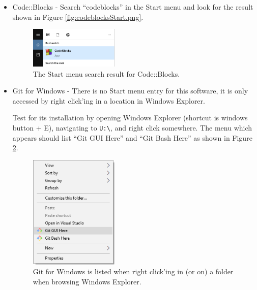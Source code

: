 \documentclass{lab}
\begin{document}
\begin{itemize}
\item Code::Blocks - Search ``codeblocks'' in the Start menu and look for the result shown in Figure \ref{fig:codeblocksStart.png}.

\begin{figure}[H]
\begin{center}
\includegraphics[width=0.4\textwidth]{Wk1Images/cbstart.png}
\end{center}
\caption{The Start menu search result for Code::Blocks.}
\label{fig:codeblocksStart}
\end{figure}

\item Git for Windows - There is no Start menu entry for this software, it is only accessed by right click'ing in a location in Windows Explorer.

Test for its installation by opening Windows Explorer (shortcut is windows button + E), navigating to \texttt{U:\textbackslash}, and right click somewhere. The menu which appears should list ``Git GUI Here'' and ``Git Bash Here'' as shown in Figure \ref{fig:gitforwindowsmenu}.

\begin{figure}[H]
\begin{center}
\includegraphics[width=0.4\textwidth]{Wk1Images/gitMenu.png}
\end{center}
\caption{Git for Windows is listed when right click'ing in (or on) a folder when browsing Windows Explorer.}
\label{fig:gitforwindowsmenu}
\end{figure}

\end{itemize}
\end{document}
